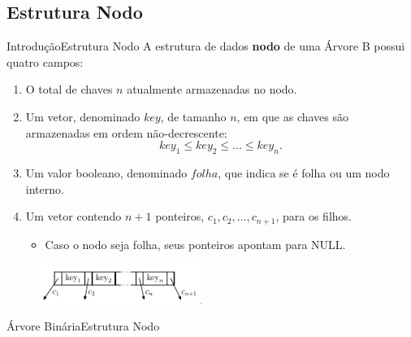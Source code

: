 \documentclass[aspectratio=169]{beamer}
\begin{document}
\subsection{Estrutura Nodo}

\begin{frame}{Introdução}{Estrutura Nodo}
A estrutura de dados {\bf nodo} de uma Árvore B possui quatro campos:
 \begin{enumerate}
 \item O total de chaves $n$ atualmente armazenadas no nodo.
 \item Um vetor, denominado $key$, de tamanho $n$, em que as chaves são armazenadas em ordem não-decrescente:
 \begin{equation}
  key_1 \leq key_2 \leq ... \leq key_n. \nonumber
 \end{equation}
 \item Um valor booleano, denominado $folha$, que indica se é folha ou um nodo interno.
 \item Um vetor contendo $n+1$ ponteiros, $c_1, c_2, ..., c_{n+1}$, para os filhos.
 \begin{itemize}
 \item Caso o nodo seja folha, seus ponteiros apontam para NULL.
 \end{itemize}
 \end{enumerate}
\begin{figure}[!h]
  \centering
   \includegraphics[width=150pt]{imagens/estrutura_nodo.png}
  \label{fig_estrutura_nodo}
\end{figure} 
\end{frame}


\begin{frame}[fragile]{Árvore Binária}{Estrutura Nodo}
\begin{algorithm}[H]
\caption{Nodo} 
\label{Nodo}
\end{algorithm} 
\end{frame}
\end{document}
